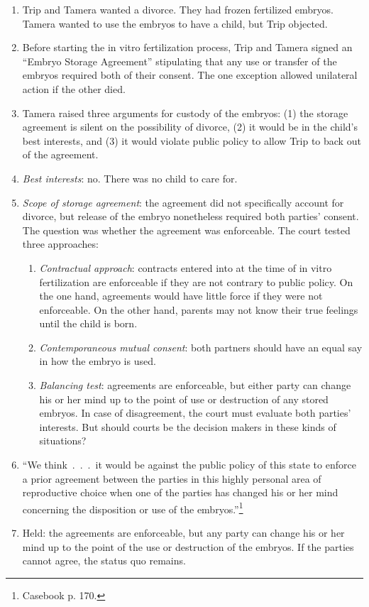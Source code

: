 \begin{enumerate}
    \item Trip and Tamera wanted a divorce. They had frozen fertilized 
    embryos. Tamera wanted to use the embryos to have a child, but Trip 
    objected.
    \item Before starting the in vitro fertilization process, Trip and Tamera 
    signed an ``Embryo Storage Agreement'' stipulating that any use or 
    transfer of the embryos required both of their consent. The one exception 
    allowed unilateral action if the other died.
    \item Tamera raised three arguments for custody of the embryos: (1) the 
    storage agreement is silent on the possibility of divorce, (2) it would be 
    in the child's best interests, and (3) it would violate public policy to 
    allow Trip to back out of the agreement.
    \item \emph{Best interests}: no. There was no child to care for.
    \item \emph{Scope of storage agreement}: the agreement did not 
    specifically account for divorce, but release of the embryo nonetheless 
    required both parties' consent. The question was whether the agreement was 
    enforceable. The court tested three approaches:
    \begin{enumerate}
        \item \emph{Contractual approach}: contracts entered into at the time 
        of in vitro fertilization are enforceable if they are not contrary to 
        public policy. On the one hand, agreements would have little force if 
        they were not enforceable. On the other hand, parents may not know 
        their true feelings until the child is born.
        \item \emph{Contemporaneous mutual consent}: both partners should have 
        an equal say in how the embryo is used.
        \item \emph{Balancing test}: agreements are enforceable, but either 
        party can change his or her mind up to the point of use or destruction 
        of any stored embryos. In case of disagreement, the court must 
        evaluate both parties' interests. But should courts be the decision 
        makers in these kinds of situations?
    \end{enumerate}
    \item ``We think~.~.~.~it would be against the public policy of this state 
    to enforce a prior agreement between the parties in this highly personal 
    area of reproductive choice when one of the parties has changed his or her 
    mind concerning the disposition or use of the embryos.''\footnote{Casebook 
    p. 170.}
    \item Held: the agreements are enforceable, but any party can change his 
    or her mind up to the point of the use or destruction of the embryos. If 
    the parties cannot agree, the status quo remains.
\end{enumerate}

